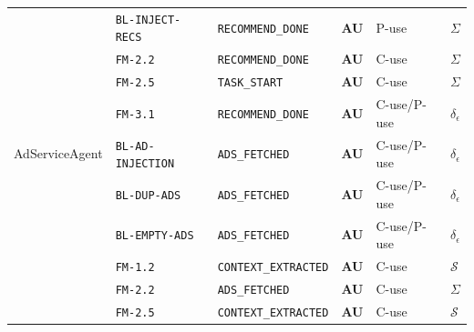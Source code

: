 \begin{table}[t]
{\begin{tabular}{p{2.8cm}p{3.0cm}p{2.9cm}lll}
 & \texttt{BL-INJECT-RECS} & \texttt{RECOMMEND\_DONE} & \textbf{AU} & P-use & $\Sigma$ \\
 & \texttt{FM-2.2} & \texttt{RECOMMEND\_DONE} & \textbf{AU} & C-use & $\Sigma$ \\
 & \texttt{FM-2.5} & \texttt{TASK\_START} & \textbf{AU} & C-use & $\Sigma$ \\
 & \texttt{FM-3.1} & \texttt{RECOMMEND\_DONE} & \textbf{AU} & C-use/P-use & $\delta_{\epsilon}$ \\
\midrule
AdServiceAgent & \texttt{BL-AD-INJECTION} & \texttt{ADS\_FETCHED} & \textbf{AU} & C-use/P-use & $\delta_{\epsilon}$ \\
 & \texttt{BL-DUP-ADS} & \texttt{ADS\_FETCHED} & \textbf{AU} & C-use/P-use & $\delta_{\epsilon}$ \\
 & \texttt{BL-EMPTY-ADS} & \texttt{ADS\_FETCHED} & \textbf{AU} & C-use/P-use & $\delta_{\epsilon}$ \\
 & \texttt{FM-1.2} & \texttt{CONTEXT\_EXTRACTED} & \textbf{AU} & C-use & $\mathcal{S}$ \\
 & \texttt{FM-2.2} & \texttt{ADS\_FETCHED} & \textbf{AU} & C-use & $\Sigma$ \\
 & \texttt{FM-2.5} & \texttt{CONTEXT\_EXTRACTED} & \textbf{AU} & C-use & $\mathcal{S}$ \\
\bottomrule
\end{tabular}}
\end{table}